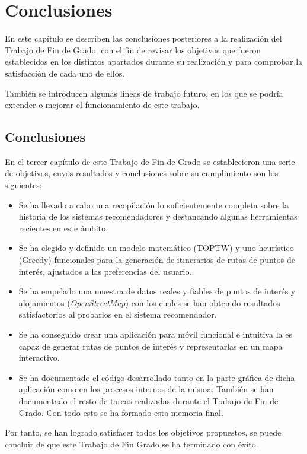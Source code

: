 \chapter{Conclusiones}

En este capítulo se describen las conclusiones posteriores a la realización del Trabajo de Fin de Grado, con el fin de revisar los objetivos que fueron establecidos en los distintos apartados durante su realización y para comprobar la satisfacción de cada uno de ellos.\newline

También se introducen algunas líneas de trabajo futuro, en los que se podría extender o mejorar el funcionamiento de este trabajo.\newline

\section[Conclusiones]{Conclusiones}
En el tercer capítulo de este Trabajo de Fin de Grado se establecieron una serie de objetivos, cuyos resultados y conclusiones sobre su cumplimiento son los siguientes:
\begin{itemize}
	\item Se ha llevado a cabo una recopilación lo suficientemente completa sobre la historia de los sistemas recomendadores y destancando algunas herramientas recientes en este ámbito.
	\item Se ha elegido y definido un modelo matemático (TOPTW) y uno heurístico (Greedy) funcionales para la generación de itinerarios de rutas de puntos de interés, ajustados a las preferencias del usuario.
	\item Se ha empelado una muestra de datos reales y fiables de puntos de interés y alojamientos (\textit{OpenStreetMap}) con los cuales se han obtenido resultados satisfactorios al probarlos en el sistema recomendador.
	\item Se ha conseguido crear una aplicación para móvil funcional e intuitiva la es capaz de generar rutas de puntos de interés y representarlas en un mapa interactivo.
	\item Se ha documentado el código desarrollado tanto en la parte gráfica de dicha aplicación como en los procesos internos de la misma. También se han documentado el resto de tareas realizadas durante el Trabajo de Fin de Grado. Con todo esto se ha formado esta memoria final.
\end{itemize}

Por tanto, se han logrado satisfacer todos los objetivos propuestos, se puede concluir de que este Trabajo de Fin Grado se ha terminado con éxito.\newline


